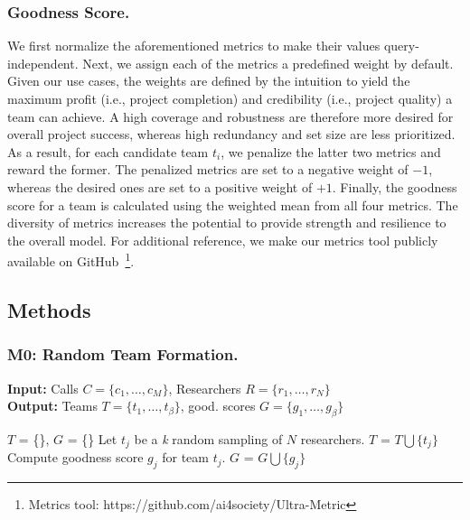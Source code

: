 \subsubsection{Goodness Score.} We first normalize the aforementioned metrics to make their values query-independent. Next, we assign each of the metrics a predefined weight by default. Given our use cases, the weights are defined by the intuition to yield the maximum profit (i.e., project completion) and credibility (i.e., project quality) a team can achieve. A high coverage and robustness are therefore more desired for overall project success, whereas high redundancy and set size are less prioritized. As a result, for each candidate team $t_i$, we penalize the latter two metrics and reward the former. The penalized metrics are set to a negative weight of $-1$, whereas the desired ones are set to a positive weight of $+1$. Finally, the goodness score for a team is calculated using the weighted mean from all four metrics. The diversity of metrics increases the potential to provide strength and resilience to the overall model. For additional reference, we make our metrics tool publicly available on GitHub~\footnote{Metrics tool: https://github.com/ai4society/Ultra-Metric}.

\subsection{Methods}
\subsubsection{M0: Random Team Formation.}
\begin{algorithm} 
	\caption{{\it M0:} Random Team Formation} 
 {\small
 \begin{flushleft}
        \hspace*{\algorithmicindent} \textbf{Input:} Calls $C=\{c_1, \ldots, c_M\}$, Researchers $R=\{r_1, \ldots, r_N\}$\\
        \hspace*{\algorithmicindent} \textbf{Output:} Teams $T=\{t_1, \ldots, t_\beta\}$, good. scores
        $G=\{g_1, \ldots, g_\beta\}$
 \end{flushleft}
 \label{algo:m0}
	\begin{algorithmic}[1]
            \State $T$ = \{\}, $G$ = \{\}     
            	\State Let $t_j$ be a \textit{k} random sampling of $N$ researchers.
            \State $T$ = $T \bigcup \{t_j\}$ 
            \State Compute goodness score $g_j$ for team $t_j$. 
            \State $G$ = $G \bigcup \{g_j\}$ 
		      \EndFor
		\EndFor
	\end{algorithmic} 
 }
\end{algorithm}

